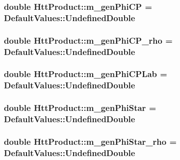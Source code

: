 \label{classHttProduct_a2fe4a315ccbd2834d619db751d842cb8}
\hypertarget{classHttProduct_a5462fd77ffc176948b012b32406dd4f3}{
\subsubsection[{m\_\-genPhiCP}]{\setlength{\rightskip}{0pt plus 5cm}double {\bf HttProduct::m\_\-genPhiCP} = DefaultValues::UndefinedDouble}}
\label{classHttProduct_a5462fd77ffc176948b012b32406dd4f3}
\hypertarget{classHttProduct_a91a52a64c8c738cbb842fe389c60c07d}{
\subsubsection[{m\_\-genPhiCP\_\-rho}]{\setlength{\rightskip}{0pt plus 5cm}double {\bf HttProduct::m\_\-genPhiCP\_\-rho} = DefaultValues::UndefinedDouble}}
\label{classHttProduct_a91a52a64c8c738cbb842fe389c60c07d}
\hypertarget{classHttProduct_aec9091c51829b8de6be9303ec1002c7a}{
\subsubsection[{m\_\-genPhiCPLab}]{\setlength{\rightskip}{0pt plus 5cm}double {\bf HttProduct::m\_\-genPhiCPLab} = DefaultValues::UndefinedDouble}}
\label{classHttProduct_aec9091c51829b8de6be9303ec1002c7a}
\hypertarget{classHttProduct_a42f44956643d702be12d765e1eecf960}{
\subsubsection[{m\_\-genPhiStar}]{\setlength{\rightskip}{0pt plus 5cm}double {\bf HttProduct::m\_\-genPhiStar} = DefaultValues::UndefinedDouble}}
\label{classHttProduct_a42f44956643d702be12d765e1eecf960}
\hypertarget{classHttProduct_a8d816230bd59c76d77a3833858e8434c}{
\subsubsection[{m\_\-genPhiStar\_\-rho}]{\setlength{\rightskip}{0pt plus 5cm}double {\bf HttProduct::m\_\-genPhiStar\_\-rho} = DefaultValues::UndefinedDouble}}
